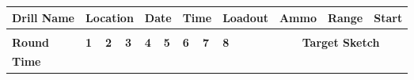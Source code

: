 \documentclass[../Cover.tex]{subfiles}
\begin{document}
\begin{minipage}[t][0.85\textheight][t]{\textwidth}
	\vspace*{0.02\textheight}
	\begin{tabular}{|l|l|l|l|l|l|l|l|l|l|l|l|l|l|l|l|l|l|l|l|}
		\hline
		\multicolumn{3}{|l|}{\cellcolor[HTML]{C0C0C0}\textbf{Drill Name}} & \multicolumn{3}{l|}{\cellcolor[HTML]{C0C0C0}\textbf{Location}}                                               & \multicolumn{2}{l|}{\cellcolor[HTML]{C0C0C0}\textbf{Date}}              & \multicolumn{2}{l|}{\cellcolor[HTML]{C0C0C0}\textbf{Time}}              & \multicolumn{3}{l|}{\cellcolor[HTML]{C0C0C0}\textbf{Loadout}} & \multicolumn{3}{l|}{\cellcolor[HTML]{C0C0C0}\textbf{Ammo}} & \multicolumn{2}{l|}{\cellcolor[HTML]{C0C0C0}\textbf{Range}} & \multicolumn{2}{l|}{\cellcolor[HTML]{C0C0C0}\textbf{Start}} \\ \hline
		\multicolumn{3}{|l|}{}                                            & \multicolumn{3}{l|}{}                                                                                        & \multicolumn{2}{l|}{}                                                   & \multicolumn{2}{l|}{}                                                   & \multicolumn{3}{l|}{}                                         & \multicolumn{3}{l|}{}                                      & \multicolumn{2}{l|}{}                                       & \multicolumn{2}{l|}{}                                       \\ \hline
		\multicolumn{3}{|l|}{\cellcolor[HTML]{C0C0C0}\textbf{Round}}      & \cellcolor[HTML]{C0C0C0}\textbf{1} & \cellcolor[HTML]{C0C0C0}\textbf{2} & \cellcolor[HTML]{C0C0C0}\textbf{3} & \cellcolor[HTML]{C0C0C0}\textbf{4} & \cellcolor[HTML]{C0C0C0}\textbf{5} & \cellcolor[HTML]{C0C0C0}\textbf{6} & \cellcolor[HTML]{C0C0C0}\textbf{7} & \cellcolor[HTML]{C0C0C0}\textbf{8}        &         & \multicolumn{8}{c|}{\cellcolor[HTML]{C0C0C0}\textbf{Target Sketch}}                                                                                                                              \\ \cline{1-11} \cline{13-20} 
		\multicolumn{3}{|l|}{\textbf{Time}}                               &                                    &                                    &                                    &                                    &                                    &                                    &                                    &                                           &         & \multicolumn{8}{l|}{}                                                                                                                                                                            \\ \cline{1-11}

\end{tabular}
\end{minipage}
\end{document}

